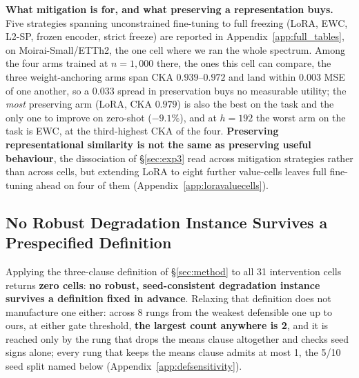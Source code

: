 \textbf{What mitigation is for, and what preserving a representation buys.}
Five strategies spanning unconstrained fine-tuning to full freezing (LoRA, EWC,
L2-SP, frozen encoder, strict freeze) are reported in
Appendix~\ref{app:full_tables}, on Moirai-Small/ETTh2, the one cell where we ran
the whole spectrum.  Among the four arms trained at $n{=}1{,}000$ there, the ones
this cell can compare, the three weight-anchoring arms span CKA $0.939$--$0.972$
and land within $0.003$ MSE of one another, so a $0.033$ spread in preservation
buys no measurable utility; the \emph{most} preserving arm (LoRA, CKA $0.979$) is
also the best on the task and the only one to improve on zero-shot ($-9.1\%$),
and at $h{=}192$ the worst arm on the task is EWC, at the third-highest CKA of
the four.  \textbf{Preserving representational similarity is not the same as
preserving useful behaviour}, the dissociation of \S\ref{sec:exp3} read across
mitigation strategies rather than across cells, but extending LoRA to eight
further value-cells leaves full fine-tuning ahead on four of them
(Appendix~\ref{app:loravaluecells}).

\subsection{No Robust Degradation Instance Survives a Prespecified Definition}
\label{sec:analysis:degradation}

Applying the three-clause definition of \S\ref{sec:method} to all 31
intervention cells returns \textbf{zero cells}: \textbf{no robust,
seed-consistent degradation instance survives a definition fixed in advance}.
Relaxing that definition does not manufacture one either: across 8 rungs from the
weakest defensible one up to ours, at either gate threshold, \textbf{the largest
count anywhere is 2}, and it is reached only by the rung that drops the means
clause altogether and checks seed signs alone; every rung that keeps the means
clause admits at most 1, the 5/10 seed split named below
(Appendix~\ref{app:defsensitivity}).

